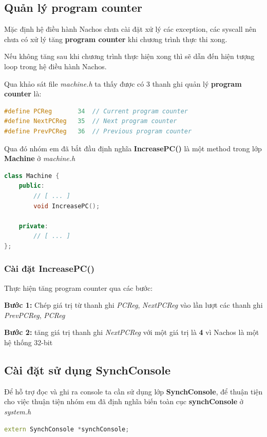 \subsection{Quản lý program counter}
Mặc định hệ điều hành Nachos chưa cài đặt xử lý các exception, các syscall nên chưa có xử lý tăng \textbf{program counter} khi chương trình thực thi xong.

Nếu không tăng sau khi chương trình thực hiện xong thì sẽ dẫn đến hiện tượng loop trong hệ điều hành Nachos.

Qua khảo sát file \textit{machine.h} ta thấy được có 3 thanh ghi quản lý \textbf{program counter} là:
\begin{lstlisting}[caption={Định nghĩa PC}, label={lst:vdcode}, language=C++]
#define PCReg		34	// Current program counter
#define NextPCReg	35	// Next program counter
#define PrevPCReg	36	// Previous program counter
\end{lstlisting}

\vskip 0.5cm

Qua đó nhóm em đã bắt đầu định nghĩa \textbf{IncreasePC()} là một method trong lớp \textbf{Machine} ở \textit{machine.h}
\begin{lstlisting}[caption={Định nghĩa IncreasePC()}, label={lst:vdcode}, language=C++]
class Machine {
    public:
        // [ ... ]
        void IncreasePC();

    private:
        // [ ... ]
};
\end{lstlisting}

\subsubsection{Cài đặt IncreasePC()}
Thực hiện tăng program counter qua các bước:
\begin{addmargin}[40pt]{0pt}
\textbf{Bước 1: } Chép giá trị từ thanh ghi \textit{PCReg}, \textit{NextPCReg} vào lần lượt các thanh ghi \textit{PrevPCReg}, \textit{PCReg}
\end{addmargin}
\begin{addmargin}[40pt]{0pt}
\textbf{Bước 2: } tăng giá trị thanh ghi \textit{NextPCReg} với một giá trị là \textbf{4} vì Nachos là một hệ thống 32-bit
\end{addmargin}

\subsection{Cài đặt sử dụng SynchConsole}
Để hỗ trợ đọc và ghi ra console ta cần sử dụng lớp \textbf{SynchConsole}, để thuận tiện cho việc thuận tiện nhóm em đã định nghĩa biến toàn cục \textbf{synchConsole} ở \textit{system.h}
\begin{lstlisting}[caption={Định nghĩa biến synchConsole}, label={lst:vdcode}, language=C++]
extern SynchConsole *synchConsole;
\end{lstlisting}

